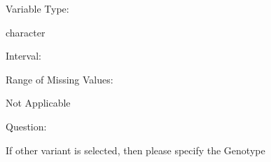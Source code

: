 \documentclass[
]{article}
\begin{document}
\begin{minipage}[t]{0.3\linewidth}

Variable Type:

\end{minipage}%
\begin{minipage}[t]{0.7\linewidth}

character

\end{minipage}

\begin{minipage}[t]{0.3\linewidth}

Interval:

\end{minipage}%
\begin{minipage}[t]{0.7\linewidth}

\end{minipage}

\begin{minipage}[t]{0.3\linewidth}

Range of Missing Values:

\end{minipage}%
\begin{minipage}[t]{0.7\linewidth}

Not Applicable

\end{minipage}

\begin{minipage}[t]{0.3\linewidth}

Question:

\end{minipage}%
\begin{minipage}[t]{0.7\linewidth}

If other variant is selected, then please specify the Genotype

\end{minipage}
\end{document}
